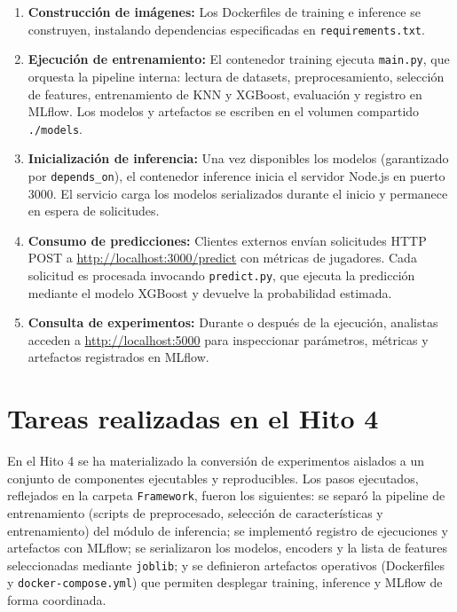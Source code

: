 \documentclass{ULBreport} %
\begin{document}
\begin{enumerate}
    \item \textbf{Construcción de imágenes:} Los Dockerfiles de training e inference se construyen, instalando dependencias especificadas en \texttt{requirements.txt}.
    
    \item \textbf{Ejecución de entrenamiento:} El contenedor training ejecuta \texttt{main.py}, que orquesta la pipeline interna: lectura de datasets, preprocesamiento, selección de features, entrenamiento de KNN y XGBoost, evaluación y registro en MLflow. Los modelos y artefactos se escriben en el volumen compartido \texttt{./models}.
    
    \item \textbf{Inicialización de inferencia:} Una vez disponibles los modelos (garantizado por \texttt{depends\_on}), el contenedor inference inicia el servidor Node.js en puerto 3000. El servicio carga los modelos serializados durante el inicio y permanece en espera de solicitudes.
    
    \item \textbf{Consumo de predicciones:} Clientes externos envían solicitudes HTTP POST a \url{http://localhost:3000/predict} con métricas de jugadores. Cada solicitud es procesada invocando \texttt{predict.py}, que ejecuta la predicción mediante el modelo XGBoost y devuelve la probabilidad estimada.
    
    \item \textbf{Consulta de experimentos:} Durante o después de la ejecución, analistas acceden a \url{http://localhost:5000} para inspeccionar parámetros, métricas y artefactos registrados en MLflow.
\end{enumerate}

\section{Tareas realizadas en el Hito 4}

En el Hito 4 se ha materializado la conversión de experimentos aislados a un conjunto de componentes ejecutables y reproducibles. Los pasos ejecutados, reflejados en la carpeta \texttt{Framework}, fueron los siguientes: se separó la pipeline de entrenamiento (scripts de preprocesado, selección de características y entrenamiento) del módulo de inferencia; se implementó registro de ejecuciones y artefactos con MLflow; se serializaron los modelos, encoders y la lista de features seleccionadas mediante \texttt{joblib}; y se definieron artefactos operativos (Dockerfiles y \texttt{docker-compose.yml}) que permiten desplegar training, inference y MLflow de forma coordinada.
\end{document}

